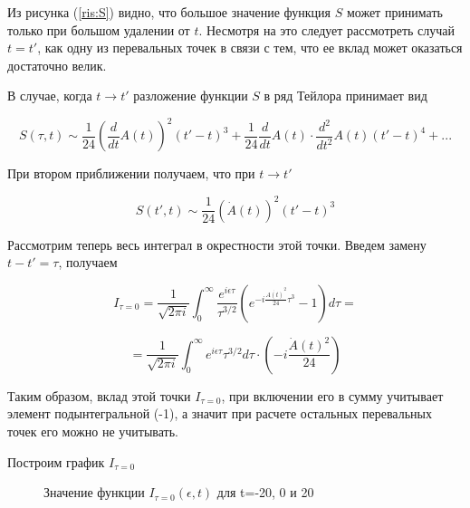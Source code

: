 \documentclass[14pt]{extarticle}
\begin{document}
Из рисунка (\ref{ris:S}) видно, что большое значение функция $S$ может принимать только при большом удалении от $t$. Несмотря на это следует рассмотреть случай $t = t'$, как одну из перевальных точек в связи с тем, что ее вклад может оказаться достаточно велик.

В случае, когда $t \rightarrow t'$ разложение функции $S$ в ряд Тейлора принимает вид

$$ 
S(\tau, t) \sim \frac{1}{24} \left( \frac{d}{dt}A(t)\right)^{2}(t' - t)^3 + \frac{1}{24} \frac{d}{dt}A(t) \cdot \frac{d^2}{dt^2}A(t) (t' - t)^4 + ...
$$

При втором приближении получаем, что при $t \rightarrow t'$ 

\begin{equation}\label{eq:S_0}
	S(t', t) \sim \frac{1}{24} \left( \dot{A}(t)\right)^{2}(t' - t)^3
\end{equation}

Рассмотрим теперь весь интеграл в окрестности этой точки.
Введем замену $t - t' = \tau$, получаем 

$$
I_{\tau = 0} = \frac{1}{\sqrt{2\pi i}} \int_{0}^{\infty} \frac{e^{i \epsilon \tau}}{\tau^{3/2}} \left(e^{-i \frac{\dot{A(t)}^2}{24} \tau^3} - 1\right) d\tau  = 
$$

$$
= \frac{1}{\sqrt{2\pi i}} \int_{0}^{\infty} e^{i \epsilon \tau} \tau^{3/2} d\tau \cdot \left(-i\frac{\dot{A}(t)^2}{24}\right) 
$$

Таким образом, вклад этой точки $I_{\tau = 0}$, при включении его в сумму учитывает элемент подынтегральной (-1), а значит при расчете остальных перевальных точек его можно не учитывать.

Построим график $I_{\tau = 0}$

\begin{figure}[h]
	\caption{Значение функции $I_{\tau = 0}(\epsilon, t)$ для t=-20, 0 и 20}
	\label{ris:I_0}
\end{figure}
\end{document}
